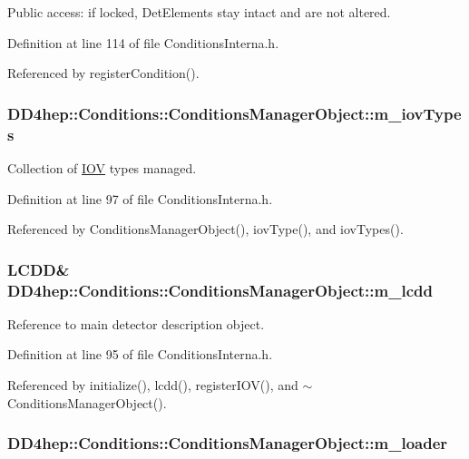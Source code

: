 Public access: if locked, DetElements stay intact and are not altered. 

Definition at line 114 of file ConditionsInterna.h.

Referenced by registerCondition().\hypertarget{class_d_d4hep_1_1_conditions_1_1_conditions_manager_object_abc6f28abb03bdfa1f3c0d51de6e6ac9d}{
\subsubsection[{m\_\-iovTypes}]{ {\bf DD4hep::Conditions::ConditionsManagerObject::m\_\-iovTypes}}}
\label{class_d_d4hep_1_1_conditions_1_1_conditions_manager_object_abc6f28abb03bdfa1f3c0d51de6e6ac9d}


Collection of \hyperlink{class_d_d4hep_1_1_i_o_v}{IOV} types managed. 

Definition at line 97 of file ConditionsInterna.h.

Referenced by ConditionsManagerObject(), iovType(), and iovTypes().\hypertarget{class_d_d4hep_1_1_conditions_1_1_conditions_manager_object_a6ca16a780558379464d37ca9e691e9ef}{
\subsubsection[{m\_\-lcdd}]{\setlength{\rightskip}{0pt plus 5cm}LCDD\& {\bf DD4hep::Conditions::ConditionsManagerObject::m\_\-lcdd}}}
\label{class_d_d4hep_1_1_conditions_1_1_conditions_manager_object_a6ca16a780558379464d37ca9e691e9ef}


Reference to main detector description object. 

Definition at line 95 of file ConditionsInterna.h.

Referenced by initialize(), lcdd(), registerIOV(), and $\sim$ConditionsManagerObject().\hypertarget{class_d_d4hep_1_1_conditions_1_1_conditions_manager_object_a94483d902a20171f95eaf0e2d531f05d}{
\subsubsection[{m\_\-loader}]{ {\bf DD4hep::Conditions::ConditionsManagerObject::m\_\-loader}}}
\label{class_d_d4hep_1_1_conditions_1_1_conditions_manager_object_a94483d902a20171f95eaf0e2d531f05d}


